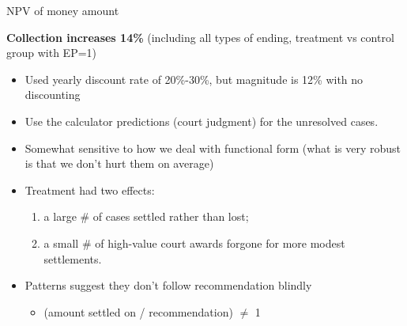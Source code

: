 \documentclass[9pt]{beamer}
\begin{document}
 \begin{frame}{NPV of money amount}
 \label{frame_NPV}
 
 \textbf{Collection increases 14\%}  (including all types of ending, treatment vs control group with EP=1)  \hyperlink{npv_itt}{} 
 \begin{itemize}
     \item Used yearly discount rate of 20\%-30\%, but magnitude is 12\% with no discounting
     \item Use the calculator predictions (court judgment) for the unresolved cases.
    \item Somewhat sensitive to how we deal with functional form (what is very robust is that we don't hurt them on average)
      \end{itemize}

 

 \vspace{.2in}
 \begin{itemize}
     \item Treatment had two effects: 
     \begin{enumerate}
         \item a large \# of cases settled rather than lost;
         \item a small \# of high-value court awards forgone for more modest settlements. 
     \end{enumerate}
      
      \vspace{.2in}
     \item Patterns suggest they don't follow recommendation blindly
     \begin{itemize}
         \item (amount settled on / recommendation) $\neq$ 1 \hyperlink{frame_FigureC6}{}
     \end{itemize}
 \end{itemize}
 \end{frame}


    
\end{document}
